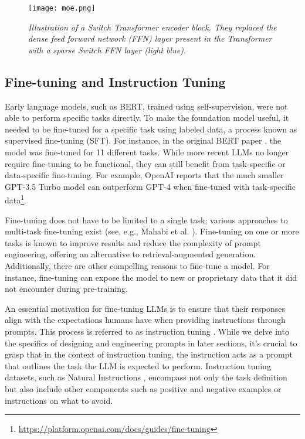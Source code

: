 \begin{figure}[H]
    \centering
    \texttt{[image: moe.png]}
    \caption{
        \it{Illustration of a Switch Transformer encoder block.
            They replaced the dense feed forward network (FFN) layer present in the Transformer with a sparse Switch FFN layer
            (light blue). \cite{fedus2022switch}}
    }
    \label{fig:moe}
\end{figure}


\subsection{Fine-tuning and Instruction Tuning}

Early language models, such as BERT, trained using self-supervision, were not able to perform specific tasks directly. To make the foundation model useful, it needed to be fine-tuned for a specific task using labeled data, a process known as supervised fine-tuning (SFT). For instance, in the original BERT paper \cite{devlin2019bert}, the model was fine-tuned for 11 different tasks. While more recent LLMs no longer require fine-tuning to be functional, they can still benefit from task-specific or data-specific fine-tuning. For example, OpenAI reports that the much smaller GPT-3.5 Turbo model can outperform GPT-4 when fine-tuned with task-specific data\footnote{\url{https://platform.openai.com/docs/guides/fine-tuning}}.

Fine-tuning does not have to be limited to a single task; various approaches to multi-task fine-tuning exist (see, e.g., Mahabi et al. \cite{mahabadi2021parameterefficient}). Fine-tuning on one or more tasks is known to improve results and reduce the complexity of prompt engineering, offering an alternative to retrieval-augmented generation. Additionally, there are other compelling reasons to fine-tune a model. For instance, fine-tuning can expose the model to new or proprietary data that it did not encounter during pre-training.

An essential motivation for fine-tuning LLMs is to ensure that their responses align with the expectations humans have when providing instructions through prompts. This process is referred to as instruction tuning \cite{zhang2024instruction}. While we delve into the specifics of designing and engineering prompts in later sections, it's crucial to grasp that in the context of instruction tuning, the instruction acts as a prompt that outlines the task the LLM is expected to perform. Instruction tuning datasets, such as Natural Instructions \cite{mishra2022crosstask}, encompass not only the task definition but also include other components such as positive and negative examples or instructions on what to avoid.

